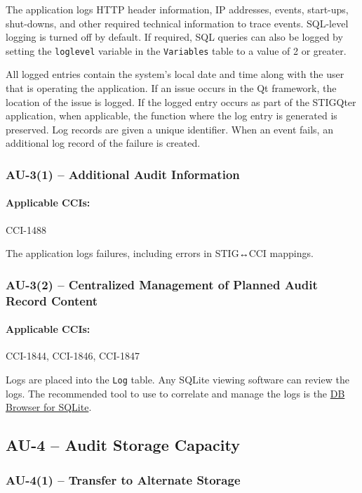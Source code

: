\documentclass[letterpaper, 10pt, twoside]{article}
\begin{document}
The application logs HTTP header information, IP addresses, events, start-ups, shut-downs, and other required technical information to trace events. SQL-level logging is turned off by default. If required, SQL queries can also be logged by setting the \texttt{loglevel} variable in the \texttt{Variables} table to a value of 2 or greater.

All logged entries contain the system's local date and time along with the user that is operating the application. If an issue occurs in the Qt framework, the location of the issue is logged. If the logged entry occurs as part of the STIGQter application, when applicable, the function where the log entry is generated is preserved. Log records are given a unique identifier. When an event fails, an additional log record of the failure is created.

\subsubsection{AU-3(1) -- Additional Audit Information}

\paragraph{Applicable CCIs:} CCI-1488

The application logs failures, including errors in STIG↔CCI mappings.

\subsubsection{AU-3(2) -- Centralized Management of Planned Audit Record Content}
\label{sec:au-3-2}

\paragraph{Applicable CCIs:} CCI-1844, CCI-1846, CCI-1847

Logs are placed into the \texttt{Log} table. Any SQLite viewing software can review the logs. The recommended tool to use to correlate and manage the logs is the \href{https://sqlitebrowser.org/}{DB Browser for SQLite}.

\subsection{AU-4 -- Audit Storage Capacity}

\subsubsection{AU-4(1) -- Transfer to Alternate Storage}
\label{sec:au-4-1}
\end{document}
